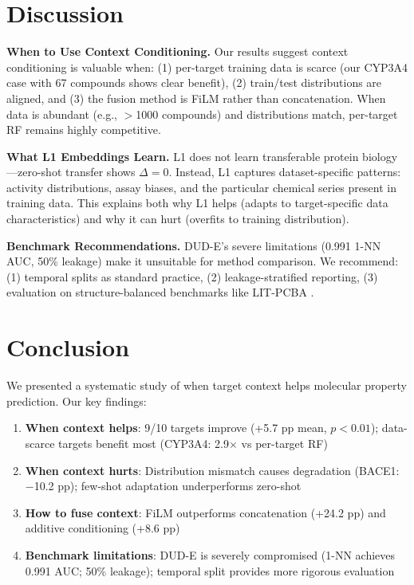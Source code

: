 \documentclass[sigconf,anonymous]{acmart}
\begin{document}
\FloatBarrier
\section{Discussion}
\label{sec:discussion}

\textbf{When to Use Context Conditioning.}
Our results suggest context conditioning is valuable when: (1) per-target training data is scarce (our CYP3A4 case with 67 compounds shows clear benefit), (2) train/test distributions are aligned, and (3) the fusion method is FiLM rather than concatenation. When data is abundant (e.g., $>$1000 compounds) and distributions match, per-target RF remains highly competitive.

\textbf{What L1 Embeddings Learn.}
L1 does not learn transferable protein biology---zero-shot transfer shows $\Delta = 0$. Instead, L1 captures dataset-specific patterns: activity distributions, assay biases, and the particular chemical series present in training data. This explains both why L1 helps (adapts to target-specific data characteristics) and why it can hurt (overfits to training distribution).

\textbf{Benchmark Recommendations.}
DUD-E's severe limitations (0.991 1-NN AUC, 50\% leakage) make it unsuitable for method comparison. We recommend: (1) temporal splits as standard practice, (2) leakage-stratified reporting, (3) evaluation on structure-balanced benchmarks like LIT-PCBA \cite{tran_2020_litpcba}.

\FloatBarrier
\section{Conclusion}
\label{sec:conclusion}

We presented a systematic study of when target context helps molecular property prediction. Our key findings:

\begin{enumerate}[noitemsep,topsep=2pt]
\item \textbf{When context helps}: 9/10 targets improve (+5.7 pp mean, $p < 0.01$); data-scarce targets benefit most (CYP3A4: 2.9$\times$ vs per-target RF)
\item \textbf{When context hurts}: Distribution mismatch causes degradation (BACE1: $-$10.2 pp); few-shot adaptation underperforms zero-shot
\item \textbf{How to fuse context}: FiLM outperforms concatenation (+24.2 pp) and additive conditioning (+8.6 pp)
\item \textbf{Benchmark limitations}: DUD-E is severely compromised (1-NN achieves 0.991 AUC; 50\% leakage); temporal split provides more rigorous evaluation
\end{enumerate}
\end{document}
